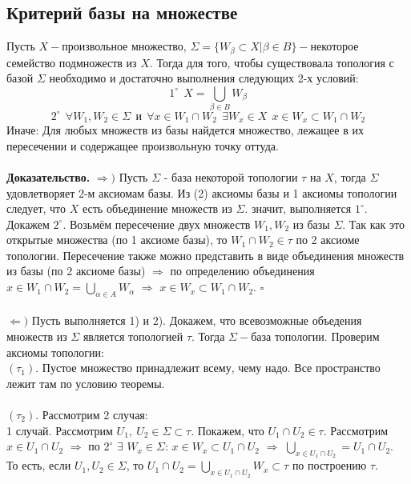 \subsection{Критерий базы на множестве}
\begin{theorem}
Пусть $X-$произвольное множество, $\Sigma=\{W_{\beta}{\subset}X|\beta{\in}B\}-$некоторое семейство подмножеств из $X$. Тогда для того, чтобы существовала топология с базой $\Sigma$ необходимо и достаточно выполнения следующих 2-х условий:\\
$$1^{\circ}\ \ X=\bigcup\limits_{\beta{\in}B}W_{\beta}$$
$$2^{\circ}\ \ \forall W_1,W_2{\in}\Sigma\ \ \text{и}\ \ \forall x{\in}W_1{\cap}W_2\ \ \exists W_x{\in}X\ \ x{\in}W_x{\subset}W_1{\cap}W_2$$
Иначе: Для любых множеств из базы найдется множество, лежащее в их пересечении и содержащее произвольную точку оттуда.\\
\\
\textbf{Доказательство.} $\Rightarrow)$ Пусть $\Sigma$ - база некоторой 
топологии $\tau$ на $X$, тогда $\Sigma$ удовлетворяет 2-м аксиомам базы. Из (2) аксиомы базы и 1 аксиомы топологии следует, что $X$ есть объединение множеств из $\Sigma$. значит, выполняется $1^{\circ}$.\\
Докажем $2^{\circ}$. Возьмём пересечение двух множеств $W_1, W_2$ из базы $\Sigma$. 
Так как это открытые множества (по 1 аксиоме базы), то $W_1{\cap}W_2{\in}\tau$ по 2 аксиоме топологии. 
Пересечение также можно представить в виде объединения множеств из базы (по 2 аксиоме базы) $\Rightarrow$ по определению объединения
$x{\in}W_1{\cap}W_2=\bigcup\limits_{\alpha{\in}A}W_{\alpha}$ $\Rightarrow$ $x{\in}W_x{\subset}W_1{\cap}W_2$. $\square$\\\\
$\Leftarrow)$ Пусть выполняется 1) и 2). Докажем, что всевозможные объедения множеств из $\Sigma$ является топологией $\tau$. Тогда $\Sigma-$база топологии. Проверим аксиомы топологии:\\
$(\tau_1)$. Пустое множество принадлежит всему, чему надо. Все пространство лежит там по условию теоремы.\\\\
$(\tau_2)$. Рассмотрим 2 случая:\\
1 случай. Рассмотрим $U_1,\ U_2{\in}\Sigma{\subset}\tau$. Покажем, что $U_1{\cap}U_2{\in}\tau$. Рассмотрим $x{\in}U_1{\cap}U_2$ $\Rightarrow$ по $2^{\circ}$ $\exists$ $W_x{\in}\Sigma$: $x{\in}W_{x}{\subset}U_1{\cap}U_2$ $\Rightarrow$ $\bigcup\limits_{x{\in}U_1{\cap}U_2}=U_1{\cap}U_2$.\\То есть, если $U_1,U_2{\in}\Sigma$, то $U_1{\cap}U_2=\bigcup\limits_{x{\in}U_1{\cap}U_2}W_x{\subset}\tau$ по построению $\tau$.\\

\end{theorem}
